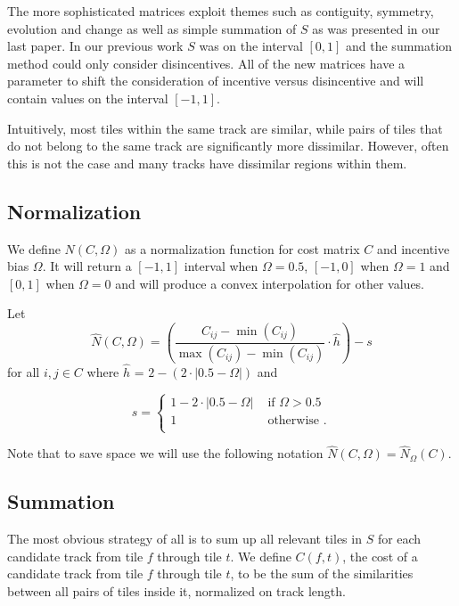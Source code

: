 \documentclass[twocolumn]{article}
\begin{document}
	The more sophisticated matrices exploit themes such as contiguity, symmetry, evolution and change as well as simple summation of $S$ as was presented in our last paper. In our previous work \cite{scarfe2013long} $S$ was on the interval $[0,1]$ and the summation method could only consider disincentives. All of the new matrices have a parameter to shift the consideration of incentive versus disincentive and will contain values on the interval $[-1,1]$.
	
	Intuitively, most tiles within the same track are similar, while pairs of tiles that do not belong to the same track are significantly more dissimilar. However, often this is not the case and many tracks have dissimilar regions within them. 
	
	\subsection{Normalization}
	
	We define $N(C,\Omega)$ as a normalization function for cost matrix $C$ and incentive bias $\Omega$. It will return a $[-1,1]$ interval when $\Omega=0.5$, $[-1,0]$ when $\Omega=1$  and $[0, 1]$ when $\Omega=0$ and will produce a convex interpolation for other values.
	
	Let 
	\begin{dmath*}
		\hat N(C,\Omega) = \left( \frac{ C_{ij} - \min \left( C_{ij} \right) }{ \max \left( C_{ij} \right) - \min \left( C_{ij} \right) } \cdot \hat h  \right)-s
	\end{dmath*}
	for all $i,j \in C$ where $\hat h$ = $2-\left( 2\cdot|0.5-\Omega| \right)$ and 

	    \begin{dmath*}
	    	s= { \left\{
	    		\begin{array}{ll}
	    			1-2 \cdot |0.5-\Omega| & \mbox{~if~}\Omega > 0.5   \\
	    			1 & \mbox{~otherwise~}.  \\
	    		\end{array}
	    		\right.}
	    \end{dmath*}
	
	Note that to save space we will use the following notation $\hat N(C, \Omega)=\hat N_\Omega(C)$.

	\subsection{Summation}
	
	The most obvious strategy of all is to sum up all relevant tiles in $S$ for each candidate track from tile $f$ through tile $t$. We define $C(f,t)$, the cost of a candidate track from tile $f$ through tile $t$, to be the sum of the similarities between all pairs of tiles inside it, normalized on track length.
	
\end{document}
